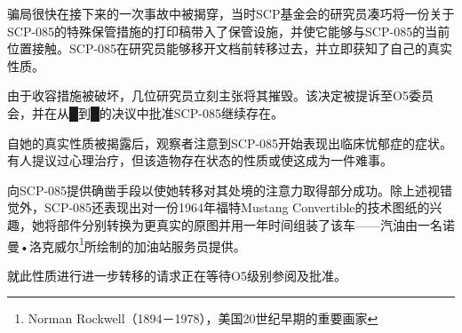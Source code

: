 骗局很快在接下来的一次事故中被揭穿，当时SCP基金会的研究员凑巧将一份关于SCP-085的特殊保管措施的打印稿带入了保管设施，并使它能够与SCP-085的当前位置接触。SCP-085在研究员能够移开文档前转移过去，并立即获知了自己的真实性质。

由于收容措施被破坏，几位研究员立刻主张将其摧毁。该决定被提诉至O5委员会，并在从█到█的决议中批准SCP-085继续存在。

自她的真实性质被揭露后，观察者注意到SCP-085开始表现出临床忧郁症的症状。有人提议过心理治疗，但该造物存在状态的性质或使这成为一件难事。

向SCP-085提供确凿手段以使她转移对其处境的注意力取得部分成功。除上述视错觉外，SCP-085还表现出对一份1964年福特Mustang Convertible的技术图纸的兴趣，她将部件分别转换为更真实的原图并用一年时间组装了该车——汽油由一名诺曼•洛克威尔\footnote{Norman Rockwell（1894－1978），美国20世纪早期的重要画家}所绘制的加油站服务员提供。

就此性质进行进一步转移的请求正在等待O5级别参阅及批准。
